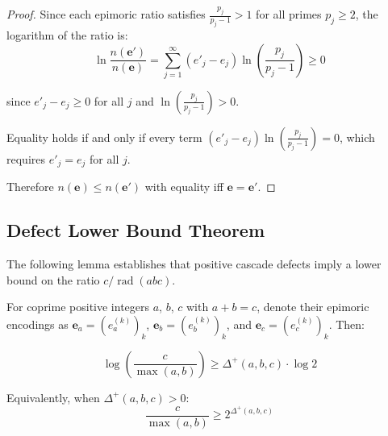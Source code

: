 \begin{proof}

Since each epimoric ratio satisfies $\frac{p_j}{p_j-1} > 1$ for all primes $p_j \geq 2$, the logarithm of the ratio is:
\begin{equation}
\ln \frac{n(\mathbf{e}')}{n(\mathbf{e})} = \sum_{j=1}^{\infty} (e'_j - e_j) \ln \left(\frac{p_j}{p_j-1}\right) \geq 0
\end{equation}

since $e'_j - e_j \geq 0$ for all $j$ and $\ln\left(\frac{p_j}{p_j-1}\right) > 0$.

Equality holds if and only if every term $(e'_j - e_j) \ln\left(\frac{p_j}{p_j-1}\right) = 0$, which requires $e'_j = e_j$ for all $j$.

Therefore $n(\mathbf{e}) \leq n(\mathbf{e}')$ with equality iff $\mathbf{e} = \mathbf{e}'$.

\end{proof}

\subsection{Defect Lower Bound Theorem}
\label{subsec:defect-lower-bound}

The following lemma establishes that positive cascade defects imply a lower bound on the ratio $c/\operatorname{rad}(abc)$.

\begin{lemma}
\label{lem:defect-ratio-lower-bound}

For coprime positive integers $a$, $b$, $c$ with $a + b = c$, denote their epimoric encodings as $\mathbf{e}_a = (e_a^{(k)})_k$, $\mathbf{e}_b = (e_b^{(k)})_k$, and $\mathbf{e}_c = (e_c^{(k)})_k$. Then:

\begin{equation}
\label{eq:defect-ratio-bound}
\log\left(\frac{c}{\max(a,b)}\right) \geq \Delta^{+}(a,b,c) \cdot \log 2
\end{equation}

Equivalently, when $\Delta^{+}(a,b,c) > 0$:
\begin{equation}
\frac{c}{\max(a,b)} \geq 2^{\Delta^{+}(a,b,c)}
\end{equation}

\end{lemma}

